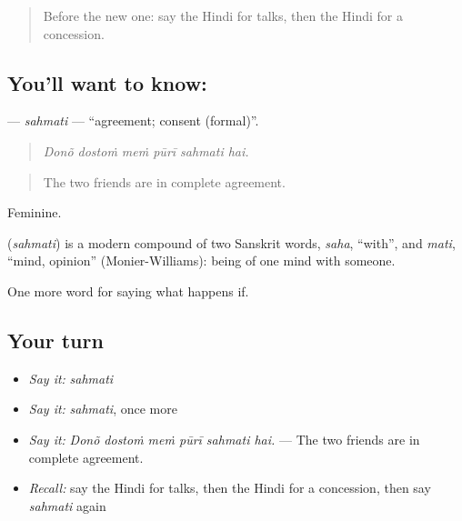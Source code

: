 \label{lesson:HI-C542-sahmati}



\begin{quote}
Before the new one: say the Hindi for talks, then the Hindi for a concession.
\end{quote}

\subsection*{You'll want to know: }
\textbf{} — \emph{sahmati} — \textquotedblleft{}agreement; consent (formal)\textquotedblright{}.

\begin{quote}
     
\end{quote}

\begin{quote}
\emph{Donõ dostoṁ meṁ pūrī sahmati hai.}
\end{quote}

\begin{quote}
The two friends are in complete agreement.
\end{quote}

Feminine.

\begin{cousinweb}
\textbf{} (\emph{sahmati}) is a modern compound of two Sanskrit words, \emph{saha}, \textquotedblleft{}with\textquotedblright{}, and \emph{mati}, \textquotedblleft{}mind, opinion\textquotedblright{} (Monier-Williams): being of one mind with someone.
\end{cousinweb}

\begin{grammarlens}[title={What you've built}]
One more word for saying what happens if.
\end{grammarlens}

\subsection*{Your turn}
\begin{itemize}
\raggedright
  \item \emph{Say it:} \emph{sahmati}
  \item \emph{Say it:} \emph{sahmati}, once more
  \item \emph{Say it:} \emph{Donõ dostoṁ meṁ pūrī sahmati hai.} — The two friends are in complete agreement.
  \item \emph{Recall:} say the Hindi for talks, then the Hindi for a concession, then say \emph{sahmati} again
\end{itemize}

